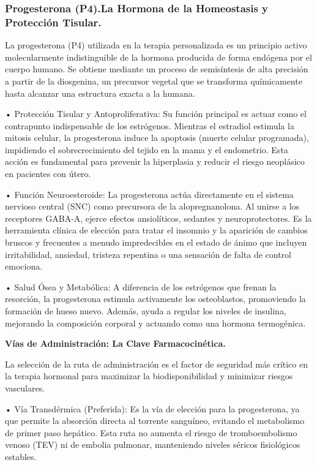 \documentclass[
  spanish,
]{article}
\begin{document}
\subsubsection{Progesterona (P4).La Hormona de la Homeostasis y Protección Tisular.}\label{progesterona-p4.la-hormona-de-la-homeostasis-y-protecciuxf3n-tisular.}

La progesterona (P4) utilizada en la terapia personalizada es un principio activo molecularmente indistinguible de la hormona producida de forma endógena por el cuerpo humano. Se obtiene mediante un proceso de semisíntesis de alta precisión a partir de la diosgenina, un precursor vegetal que se transforma químicamente hasta alcanzar una estructura exacta a la humana.

• Protección Tisular y Antoproliferativa: Su función principal es actuar como el contrapunto indispensable de los estrógenos. Mientras el estradiol estimula la mitosis celular, la progesterona induce la apoptosis (muerte celular programada), impidiendo el sobrecrecimiento del tejido en la mama y el endometrio. Esta acción es fundamental para prevenir la hiperplasia y reducir el riesgo neoplásico en pacientes con útero.

• Función Neuroesteroide: La progesterona actúa directamente en el sistema nervioso central (SNC) como precursora de la alopregnanolona. Al unirse a los receptores GABA-A, ejerce efectos ansiolíticos, sedantes y neuroprotectores. Es la herramienta clínica de elección para tratar el insomnio y la aparición de cambios bruscos y frecuentes a menudo impredecibles en el estado de ánimo que incluyen irritabilidad, ansiedad, tristeza repentina o una sensación de falta de control emociona.

• Salud Ósea y Metabólica: A diferencia de los estrógenos que frenan la resorción, la progesterona estimula activamente los osteoblastos, promoviendo la formación de hueso nuevo. Además, ayuda a regular los niveles de insulina, mejorando la composición corporal y actuando como una hormona termogénica.

\textbf{Vías de Administración: La Clave Farmacocinética.}

La selección de la ruta de administración es el factor de seguridad más crítico en la terapia hormonal para maximizar la biodisponibilidad y minimizar riesgos vasculares.

• Vía Transdérmica (Preferida): Es la vía de elección para la progesterona, ya que permite la absorción directa al torrente sanguíneo, evitando el metabolismo de primer paso hepático. Esta ruta no aumenta el riesgo de tromboembolismo venoso (TEV) ni de embolia pulmonar, manteniendo niveles séricos fisiológicos estables.
\end{document}
